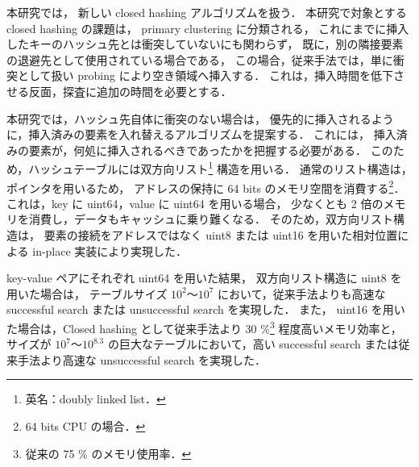 
本研究では，
新しい closed hashing アルゴリズムを扱う．
本研究で対象とする closed hashing の課題は，
primary clustering に分類される，
これにまでに挿入したキーのハッシュ先とは衝突していないにも関わらず，
既に，別の隣接要素の退避先として使用されている場合である，
この場合，従来手法では，単に衝突として扱い probing により空き領域へ挿入する．
これは，挿入時間を低下させる反面，探査に追加の時間を必要とする．

本研究では，ハッシュ先自体に衝突のない場合は，
優先的に挿入されるように，挿入済みの要素を入れ替えるアルゴリズムを提案する．
これには，
挿入済みの要素が，何処に挿入されるべきであったかを把握する必要がある．
このため，ハッシュテーブルには双方向リスト\footnote{英名：doubly linked list．} 構造を用いる．
通常のリスト構造は，ポインタを用いるため，
アドレスの保持に 64 bits のメモリ空間を消費する\footnote{64 bits CPU の場合．}．
これは，key に uint64，value に uint64 を用いる場合，
少なくとも 2 倍のメモリを消費し，データもキャッシュに乗り難くなる．
そのため，双方向リスト構造は，
要素の接続をアドレスではなく uint8 または uint16 を用いた相対位置による in-place 実装により実現した．

key-value ペアにそれぞれ uint64 を用いた結果，
双方向リスト構造に uint8 を用いた場合は，
テーブルサイズ $10^2〜10^{7}$ において，従来手法よりも高速な successful search または unsuccessful search を実現した．
また，
uint16 を用いた場合は，Closed hashing として従来手法より 30 \%\footnote{従来の 75 \% のメモリ使用率．} 程度高いメモリ効率と，
サイズが $10^7〜10^{8.3}$ の巨大なテーブルにおいて，高い successful search または従来手法より高速な unsuccessful search を実現した．







